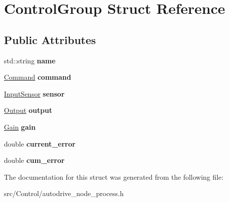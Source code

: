 \hypertarget{structControlGroup}{}\section{Control\+Group Struct Reference}
\label{structControlGroup}
\subsection*{Public Attributes}
\begin{DoxyCompactItemize}
\item 
\mbox{\label{structControlGroup_abf389dc4cf31d5cf2d10c654ab96a2ec}} 
std\+::string {\bfseries name}
\item 
\mbox{\label{structControlGroup_ad6d790c8cb929197e411241de6ee7d82}} 
\hyperlink{structCommand}{Command} {\bfseries command}
\item 
\mbox{\label{structControlGroup_a35d6d4df71ce0d90272a1e8804679999}} 
\hyperlink{structInputSensor}{Input\+Sensor} {\bfseries sensor}
\item 
\mbox{\label{structControlGroup_aacba757d243164a22d7878821731ee4f}} 
\hyperlink{structOutput}{Output} {\bfseries output}
\item 
\mbox{\label{structControlGroup_a74ac9638d05739561151f69fe55b2549}} 
\hyperlink{structGain}{Gain} {\bfseries gain}
\item 
\mbox{\label{structControlGroup_a45d7f7ad47557b571a91da5a4f56c93c}} 
double {\bfseries current\+\_\+error}
\item 
\mbox{\label{structControlGroup_a724abe7eb8a9cc3e88b2af787b7c1507}} 
double {\bfseries cum\+\_\+error}
\end{DoxyCompactItemize}


The documentation for this struct was generated from the following file\+:\begin{DoxyCompactItemize}
\item 
src/\+Control/autodrive\+\_\+node\+\_\+process.\+h\end{DoxyCompactItemize}
